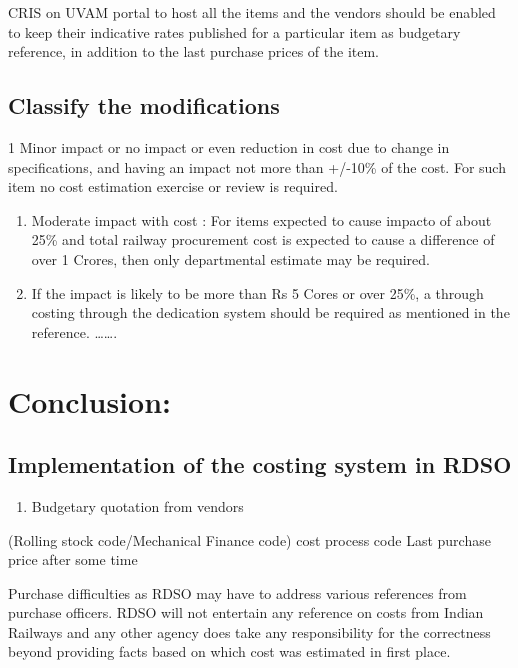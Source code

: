\documentclass[
  11pt,
  twoside]{article}
\providecommand{\tightlist}{%
  \setlength{\itemsep}{0pt}\setlength{\parskip}{0pt}}
\begin{document}
CRIS on UVAM portal to host all the items and the vendors should be enabled to keep their indicative rates published for a particular item as budgetary reference, in addition to the last purchase prices of the item.

\hypertarget{classify-the-modifications}{%
\subsection{Classify the modifications}\label{classify-the-modifications}}

1 Minor impact or no impact or even reduction in cost due to change in specifications, and having an impact not more than +/-10\% of the cost. For such item no cost estimation exercise or review is required.

\begin{enumerate}
\def\labelenumi{\arabic{enumi}.}
\setcounter{enumi}{1}
\item
  Moderate impact with cost : For items expected to cause impacto of about 25\% and total railway procurement cost is expected to cause a difference of over 1 Crores, then only departmental estimate may be required.
\item
  If the impact is likely to be more than Rs 5 Cores or over 25\%, a through costing through the dedication system should be required as mentioned in the reference. \ldots\ldots.
\end{enumerate}

\hypertarget{conclusion}{%
\section{Conclusion:}\label{conclusion}}

\hypertarget{implementation-of-the-costing-system-in-rdso}{%
\subsection{Implementation of the costing system in RDSO}\label{implementation-of-the-costing-system-in-rdso}}

\begin{enumerate}
\def\labelenumi{\arabic{enumi}.}
\tightlist
\item
  Budgetary quotation from vendors
\end{enumerate}

(Rolling stock code/Mechanical Finance code) cost process code
Last purchase price after some time

Purchase difficulties as RDSO may have to address various references from purchase officers.
RDSO will not entertain any reference on costs from Indian Railways and any other agency does take any responsibility for the correctness beyond providing facts based on which cost was estimated in first place.
\end{document}
